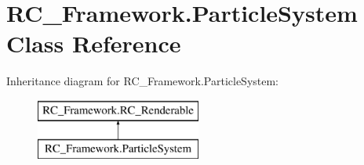 \hypertarget{class_r_c___framework_1_1_particle_system}{}\section{R\+C\+\_\+\+Framework.\+Particle\+System Class Reference}
\label{class_r_c___framework_1_1_particle_system}
Inheritance diagram for R\+C\+\_\+\+Framework.\+Particle\+System\+:\begin{figure}[H]
\begin{center}
\leavevmode
\includegraphics[height=2.000000cm]{class_r_c___framework_1_1_particle_system}
\end{center}
\end{figure}
